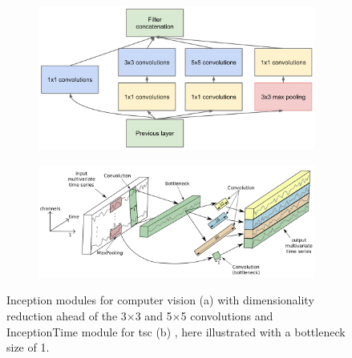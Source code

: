 


\begin{figure}
  \centering
  \begin{subfigure}[c]{0.6\textwidth}
    \includegraphics[width=\textwidth]{files/figs/inception-module-dimred.png}
    \caption{}
    \label{fig:inception-module}
  \end{subfigure}
  \begin{subfigure}[c]{0.6\textwidth}
    \includegraphics[width=\textwidth]{files/figs/inception-time-module.png}
    \caption{}
    \label{fig:inceptiontime-module}
  \end{subfigure}
  \caption{Inception modules for computer vision (a) \cite{Szegedy2015} with dimensionality reduction ahead of the 3$\times$3 and 5$\times$5 convolutions and InceptionTime module for \gls{tsc} (b) \cite{IsmailFawaz2020}, here illustrated with a bottleneck size of 1.}
\end{figure}

